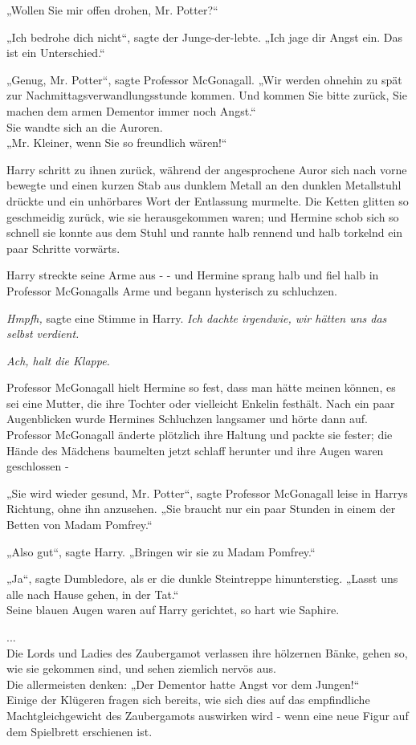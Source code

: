 {„Wollen Sie mir offen drohen, Mr. Potter?“

„Ich bedrohe dich nicht“, sagte der Junge-der-lebte. „Ich jage dir Angst ein. Das ist ein Unterschied.“

„Genug, Mr. Potter“, sagte Professor McGonagall. „Wir werden ohnehin zu spät zur Nachmittagsverwandlungsstunde kommen. Und kommen Sie bitte zurück, Sie machen dem armen Dementor immer noch Angst.“\\ Sie wandte sich an die Auroren.\\ „Mr. Kleiner, wenn Sie so freundlich wären!“

Harry schritt zu ihnen zurück, während der angesprochene Auror sich nach vorne bewegte und einen kurzen Stab aus dunklem Metall an den dunklen Metallstuhl drückte und ein unhörbares Wort der Entlassung murmelte. Die Ketten glitten so geschmeidig zurück, wie sie herausgekommen waren; und Hermine schob sich so schnell sie konnte aus dem Stuhl und rannte halb rennend und halb torkelnd ein paar Schritte vorwärts.

Harry streckte seine Arme aus - - und Hermine sprang halb und fiel halb in Professor McGonagalls Arme und begann hysterisch zu schluchzen.

\emph{Hmpfh,} sagte eine Stimme in Harry. \emph{Ich dachte irgendwie, wir hätten uns das selbst verdient.}

\emph{Ach, halt die Klappe.}

Professor McGonagall hielt Hermine so fest, dass man hätte meinen können, es sei eine Mutter, die ihre Tochter oder vielleicht Enkelin festhält. Nach ein paar Augenblicken wurde Hermines Schluchzen langsamer und hörte dann auf. Professor McGonagall änderte plötzlich ihre Haltung und packte sie fester; die Hände des Mädchens baumelten jetzt schlaff herunter und ihre Augen waren geschlossen -

„Sie wird wieder gesund, Mr. Potter“, sagte Professor McGonagall leise in Harrys Richtung, ohne ihn anzusehen. „Sie braucht nur ein paar Stunden in einem der Betten von Madam Pomfrey.“

„Also gut“, sagte Harry. „Bringen wir sie zu Madam Pomfrey.“

„Ja“, sagte Dumbledore, als er die dunkle Steintreppe hinunterstieg. „Lasst uns alle nach Hause gehen, in der Tat.“\\ Seine blauen Augen waren auf Harry gerichtet, so hart wie Saphire.

...\\ Die Lords und Ladies des Zaubergamot verlassen ihre hölzernen Bänke, gehen so, wie sie gekommen sind, und sehen ziemlich nervös aus.\\ Die allermeisten denken: „Der Dementor hatte Angst vor dem Jungen!“\\ Einige der Klügeren fragen sich bereits, wie sich dies auf das empfindliche Machtgleichgewicht des Zaubergamots auswirken wird - wenn eine neue Figur auf dem Spielbrett erschienen ist.

}

